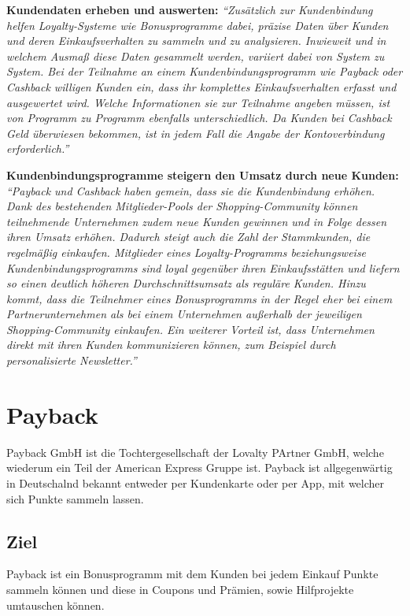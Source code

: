\noindent \textbf{Kundendaten erheben und auswerten:} \textit{``Zusätzlich zur Kundenbindung helfen Loyalty-Systeme wie Bonusprogramme dabei, präzise Daten über Kunden und deren Einkaufsverhalten zu sammeln und zu analysieren. Inwieweit und in welchem Ausmaß diese Daten gesammelt werden, variiert dabei von System zu System. Bei der Teilnahme an einem Kundenbindungsprogramm wie Payback oder Cashback willigen Kunden ein, dass ihr komplettes Einkaufsverhalten erfasst und ausgewertet wird. Welche Informationen sie zur Teilnahme angeben müssen, ist von Programm zu Programm ebenfalls unterschiedlich. Da Kunden bei Cashback Geld überwiesen bekommen, ist in jedem Fall die Angabe der Kontoverbindung erforderlich.'' \cite{paycashback_all}} \newline

\noindent \textbf{Kundenbindungsprogramme steigern den Umsatz durch neue Kunden:} \textit{``Payback und Cashback haben gemein, dass sie die Kundenbindung erhöhen. Dank des bestehenden Mitglieder-Pools der Shopping-Community können teilnehmende Unternehmen zudem neue Kunden gewinnen und in Folge dessen ihren Umsatz erhöhen. Dadurch steigt auch die Zahl der Stammkunden, die regelmäßig einkaufen. Mitglieder eines Loyalty-Programms beziehungsweise Kundenbindungsprogramms sind loyal gegenüber ihren Einkaufsstätten und liefern so einen deutlich höheren Durchschnittsumsatz als reguläre Kunden. Hinzu kommt, dass die Teilnehmer eines Bonusprogramms in der Regel eher bei einem Partnerunternehmen als bei einem Unternehmen außerhalb der jeweiligen Shopping-Community einkaufen. Ein weiterer Vorteil ist, dass Unternehmen direkt mit ihren Kunden kommunizieren können, zum Beispiel durch personalisierte Newsletter.'' \cite{paycashback_all}} \newline

\section{Payback} \label{Payback}
Payback GmbH ist die Tochtergesellschaft der Lovalty PArtner GmbH, welche wiederum ein Teil der American Express Gruppe ist. \cite{Payback_Info} Payback ist allgegenwärtig in Deutschalnd bekannt entweder per Kundenkarte oder per App, mit welcher sich Punkte sammeln lassen.

\subsection{Ziel}
Payback ist ein Bonusprogramm mit dem Kunden bei jedem Einkauf Punkte sammeln können und diese in Coupons und Prämien, sowie Hilfprojekte umtauschen können. \newline

